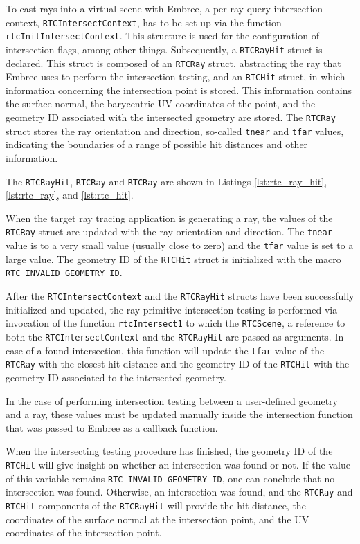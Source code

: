 To cast rays into a virtual scene with Embree, a per ray query intersection context, \texttt{RTCIntersectContext}, has to be set up via the function \texttt{rtcInitIntersectContext}. This structure is used for the configuration of intersection flags, among other things.
Subsequently, a \texttt{RTCRayHit} struct is declared. This struct is composed of an \texttt{RTCRay} struct, abstracting the ray that Embree uses to perform the intersection testing, and an \texttt{RTCHit} struct, in which information concerning the intersection point is stored. This information contains the surface normal, the barycentric UV coordinates of the point, and the geometry ID associated with the intersected geometry are stored.
The \texttt{RTCRay} struct stores the ray orientation and direction, so-called \texttt{tnear} and \texttt{tfar} values, indicating the boundaries of a range of possible hit distances and other information.

The \texttt{RTCRayHit}, \texttt{RTCRay} and \texttt{RTCRay} are shown in Listings \ref{lst:rtc_ray_hit}, \ref{lst:rtc_ray}, and \ref{lst:rtc_hit}.

When the target ray tracing application is generating a ray, the values of the \texttt{RTCRay} struct are updated with the ray orientation and direction. The \texttt{tnear} value is to a very small value (usually close to zero) and the \texttt{tfar} value is set to a large value. The geometry ID of the \texttt{RTCHit} struct is initialized with the macro \texttt{RTC\_INVALID\_GEOMETRY\_ID}.

After the \texttt{RTCIntersectContext} and the \texttt{RTCRayHit} structs have been successfully initialized and updated, the ray-primitive intersection testing is performed via invocation of the function \texttt{rtcIntersect1} to which the \texttt{RTCScene}, a reference to both the \texttt{RTCIntersectContext} and the \texttt{RTCRayHit} are passed as arguments. In case of a found intersection, this function will update the \texttt{tfar} value of the \texttt{RTCRay} with the closest hit distance and the geometry ID of the \texttt{RTCHit} with the geometry ID associated to the intersected geometry.

In the case of performing intersection testing between a user-defined geometry and a ray, these values must be updated manually inside the intersection function that was passed to Embree as a callback function.

When the intersecting testing procedure has finished, the geometry ID of the \texttt{RTCHit} will give insight on whether an intersection was found or not. If the value of this variable remains \texttt{RTC\_INVALID\_GEOMETRY\_ID}, one can conclude that no intersection was found. Otherwise, an intersection was found, and the \texttt{RTCRay} and \texttt{RTCHit} components of the \texttt{RTCRayHit} will provide the hit distance, the coordinates of the surface normal at the intersection point, and the UV coordinates of the intersection point.

